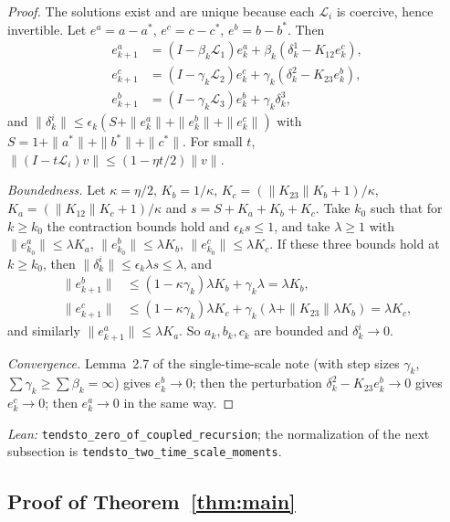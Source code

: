 \documentclass[11pt]{article}
\theoremstyle{definition}
\theoremstyle{remark}
\newcommand{\Lop}{\mathcal{L}}
\begin{document}
\begin{proof}
The solutions exist and are unique because each $\Lop_i$ is coercive, hence invertible. Let
$e^a = a - a^*$, $e^c = c - c^*$, $e^b = b - b^*$. Then
\begin{align*}
  e^a_{k+1} &= (I - \beta_k\Lop_1)e^a_k + \beta_k(\delta^1_k - K_{12}e^c_k),\\
  e^c_{k+1} &= (I - \gamma_k\Lop_2)e^c_k + \gamma_k(\delta^2_k - K_{23}e^b_k),\\
  e^b_{k+1} &= (I - \gamma_k\Lop_3)e^b_k + \gamma_k\delta^3_k ,
\end{align*}
and $\|\delta^i_k\| \le \epsilon_k(S + \|e^a_k\| + \|e^b_k\| + \|e^c_k\|)$ with
$S = 1 + \|a^*\| + \|b^*\| + \|c^*\|$. For small $t$, $\|(I - t\Lop_i)v\| \le (1 - \eta t/2)\|v\|$.

\emph{Boundedness.} Let $\kappa = \eta/2$, $K_b = 1/\kappa$,
$K_c = (\|K_{23}\|K_b + 1)/\kappa$, $K_a = (\|K_{12}\|K_c + 1)/\kappa$ and
$s = S + K_a + K_b + K_c$. Take $k_0$ such that for $k \ge k_0$ the contraction bounds hold
and $\epsilon_ks \le 1$, and take $\lambda \ge 1$ with $\|e^a_{k_0}\| \le \lambda K_a$,
$\|e^b_{k_0}\| \le \lambda K_b$, $\|e^c_{k_0}\| \le \lambda K_c$. If these three bounds hold at
$k \ge k_0$, then $\|\delta^i_k\| \le \epsilon_k\lambda s \le \lambda$, and
\begin{align*}
  \|e^b_{k+1}\| &\le (1 - \kappa\gamma_k)\lambda K_b + \gamma_k\lambda = \lambda K_b,\\
  \|e^c_{k+1}\| &\le (1 - \kappa\gamma_k)\lambda K_c + \gamma_k(\lambda + \|K_{23}\|\lambda K_b) = \lambda K_c,
\end{align*}
and similarly $\|e^a_{k+1}\| \le \lambda K_a$. So $a_k, b_k, c_k$ are bounded and $\delta^i_k \to 0$.

\emph{Convergence.} Lemma~2.7 of the single-time-scale note (with step sizes $\gamma_k$,
$\sum\gamma_k \ge \sum\beta_k = \infty$) gives $e^b_k \to 0$; then the perturbation
$\delta^2_k - K_{23}e^b_k \to 0$ gives $e^c_k \to 0$; then $e^a_k \to 0$ in the same way.
\end{proof}
\noindent\emph{Lean:} \texttt{tendsto\_zero\_of\_coupled\_recursion}; the normalization of the next
subsection is \texttt{tendsto\_two\_time\_scale\_moments}.

\subsection{Proof of Theorem~\ref{thm:main}}
\end{document}
